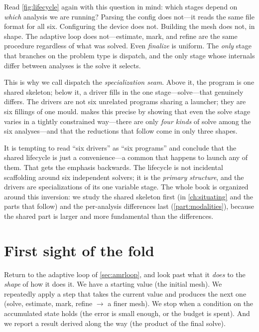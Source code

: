 Read \cref{fig:lifecycle} again with this question in mind: which stages depend on
\emph{which} analysis we are running? Parsing the config does not---it reads the
same file format for all six. Configuring the device does not. Building the mesh
does not, in shape. The adaptive loop does not---estimate, mark, and refine are
the same procedure regardless of what was solved. Even \emph{finalize} is
uniform. The \emph{only} stage that branches on the problem type is dispatch, and
the only stage whose internals differ between analyses is the solve it selects.

This is why we call dispatch the \emph{specialization seam}. Above it, the program
is one shared skeleton; below it, a driver fills in the one stage---solve---that
genuinely differs. The drivers are not six unrelated programs sharing a launcher;
they are six fillings of one mould.  makes this precise by
showing that even the solve stage varies in a tightly constrained
way---there are only \emph{four kinds} of solve among the six analyses---and that
the reductions that follow come in only three shapes.

\begin{pitfall}
It is tempting to read ``six drivers'' as ``six programs'' and conclude that the
shared lifecycle is just a convenience---a common  that happens to
launch any of them. That gets the emphasis backwards. The lifecycle is not
incidental scaffolding around six independent solvers; it is the \emph{primary
structure}, and the drivers are specializations of its one variable stage. The
whole book is organized around this inversion: we study the shared skeleton first
(in \cref{ch:situating} and the parts that follow) and the per-analysis
differences last (\cref{part:modalities}), because the shared part is larger and
more fundamental than the differences.
\end{pitfall}

\section{First sight of the fold}
\label{sec:fold}

Return to the adaptive loop of \cref{sec:amrloop}, and look past what it
\emph{does} to the \emph{shape} of how it does it. We have a starting value (the
initial mesh). We repeatedly apply a step that takes the current value and
produces the next one (solve, estimate, mark, refine $\to$ a finer mesh). We stop
when a condition on the accumulated state holds (the error is small enough, or
the budget is spent). And we report a result derived along the way (the product
of the final solve).

